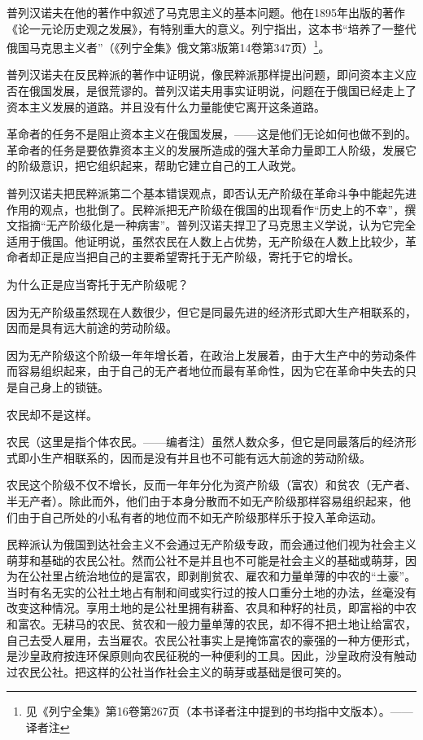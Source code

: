 普列汉诺夫在他的著作中叙述了马克思主义的基本问题。他在1895年出版的著作《论一元论历史观之发展》，有特别重大的意义。列宁指出，这本书“培养了一整代俄国马克思主义者”（《列宁全集》俄文第3版第14卷第347页）\footnote{见《列宁全集》第16卷第267页（本书译者注中提到的书均指中文版本）。——译者注}。

普列汉诺夫在反民粹派的著作中证明说，像民粹派那样提出问题，即问资本主义应否在俄国发展，是很荒谬的。普列汉诺夫用事实证明说，问题在于俄国已经走上了资本主义发展的道路。并且没有什么力量能使它离开这条道路。

革命者的任务不是阻止资本主义在俄国发展，——这是他们无论如何也做不到的。革命者的任务是要依靠资本主义的发展所造成的强大革命力量即工人阶级，发展它的阶级意识，把它组织起来，帮助它建立自己的工人政党。

普列汉诺夫把民粹派第二个基本错误观点，即否认无产阶级在革命斗争中能起先进作用的观点，也批倒了。民粹派把无产阶级在俄国的出现看作“历史上的不幸”，撰文指摘“无产阶级化是一种病害”。普列汉诺夫捍卫了马克思主义学说，认为它完全适用于俄国。他证明说，虽然农民在人数上占优势，无产阶级在人数上比较少，革命者却正是应当把自己的主要希望寄托于无产阶级，寄托于它的增长。

为什么正是应当寄托于无产阶级呢？

因为无产阶级虽然现在人数很少，但它是同最先进的经济形式即大生产相联系的，因而是具有远大前途的劳动阶级。

因为无产阶级这个阶级一年年增长着，在政治上发展着，由于大生产中的劳动条件而容易组织起来，由于自己的无产者地位而最有革命性，因为它在革命中失去的只是自己身上的锁链。

农民却不是这样。

农民（这里是指个体农民。——编者注）虽然人数众多，但它是同最落后的经济形式即小生产相联系的，因而是没有并且也不可能有远大前途的劳动阶级。

农民这个阶级不仅不增长，反而一年年分化为资产阶级（富农）和贫农（无产者、半无产者）。除此而外，他们由于本身分散而不如无产阶级那样容易组织起来，他们由于自己所处的小私有者的地位而不如无产阶级那样乐于投入革命运动。

民粹派认为俄国到达社会主义不会通过无产阶级专政，而会通过他们视为社会主义萌芽和基础的农民公社。然而公社不是并且也不可能是社会主义的基础或萌芽，因为在公社里占统治地位的是富农，即剥削贫农、雇农和力量单薄的中农的“土豪”。当时有名无实的公社土地占有制和间或实行过的按人口重分土地的办法，丝毫没有改变这种情况。享用土地的是公社里拥有耕畜、农具和种籽的社员，即富裕的中农和富农。无耕马的农民、贫农和一般力量单薄的农民，却不得不把土地让给富农，自己去受人雇用，去当雇农。农民公社事实上是掩饰富农的豪强的一种方便形式，是沙皇政府按连环保原则向农民征税的一种便利的工具。因此，沙皇政府没有触动过农民公社。把这样的公社当作社会主义的萌芽或基础是很可笑的。

